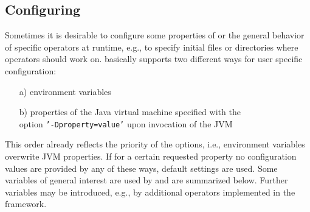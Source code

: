 \subsection{Configuring \alida}
\label{subsec:configure-user}

Sometimes it is desirable to configure 
some properties of \alida or the general behavior of specific operators at
runtime, e.g., to specify initial files or directories where operators should work on. 
\alida basically supports two different ways for user specific configuration:
\begin{itemize}
    \item[a)] environment variables
    \item[b)] properties of the Java virtual machine specified with the \\
    	option \texttt{'-Dproperty=value'} upon invocation of the JVM
\end{itemize}
This order already reflects the priority of the options, i.e., environment
variables overwrite JVM properties.
If for a certain requested property no configuration values are provided by any of these ways,
default settings are used.
Some variables of general interest are used by \alida and are summarized
below.
Further variables may be introduced, e.g., by additional operators implemented in the framework.

